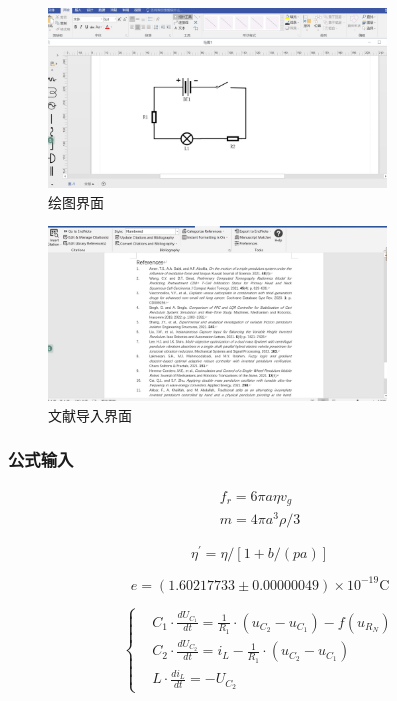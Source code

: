 \documentclass[12pt,a4paper,UTF8]{ctexart}
\begin{document}
\begin{figure}[htbp]
	\centering
	\includegraphics[width=0.8\textwidth]{img//fig2.jpg}
	\caption{绘图界面}
\end{figure}



\begin{figure}[htbp]
	\centering
	\includegraphics[width=0.8\textwidth]{img//import.jpg}
	\caption{文献导入界面}
\end{figure}



\subsubsection*{公式输入}

\begin{gather}
	f_r=6\pi a \eta v_g   \\
	m=4 \pi a^{3} \rho / 3
\end{gather}

\begin{equation}
	\eta^{\prime}=\eta /[1+b /(p a)]
\end{equation}

\[e=(1.60217733 \pm 0.00000049) \times 10^{-19} \mathrm{C}\]

\[\left\{%
\begin{aligned}
&C_{1} \cdot \frac{d U_{C_{1}}}{d t}=\frac{1}{R_{1}} \cdot(u_{C_{2}}-u_{C_{1}})-f(u_{R_{N}}) \\
&C_{2} \cdot \frac{d U_{C_{2}}}{d t}=i_{L}-\frac{1}{R_{1}} \cdot(u_{C_{2}}-u_{C_{1}}) \\
&L \cdot \frac{d i_{L}}{d t}=-U_{C_{2}}
\end{aligned}
\right.
\]
\end{document}
